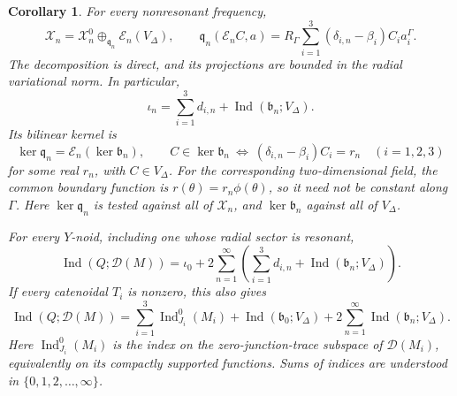 \documentclass[11pt,twoside]{amsart}
\newtheorem{cor}[thm]{Corollary}
\numberwithin{equation}{section}
\begin{document}
\begin{cor}\label{coro: general index decom}
For every nonresonant frequency,
\[
\mathcal X_n=\mathcal X_n^0\oplus_{\mathfrak q_n}\mathscr E_n(V_\Delta),
\qquad
\mathfrak q_n(\mathscr E_n C,a)
=R_\Gamma\sum_{i=1}^3(\delta_{i,n}-\beta_i)C_i a_i^\Gamma.
\]
The decomposition is direct, and its projections are bounded in the radial variational norm. In particular,
\[
\iota_n=\sum_{i=1}^3d_{i,n}
+\operatorname{Ind}(\mathfrak b_n;V_\Delta).
\]
Its bilinear kernel is
\[
\ker\mathfrak q_n
=\mathscr E_n(\ker\mathfrak b_n),
\qquad
C\in\ker\mathfrak b_n
\ \Longleftrightarrow\
(\delta_{i,n}-\beta_i)C_i=r_n\quad(i=1,2,3)
\]
for some real $r_n$, with $C\in V_\Delta$. For the corresponding two-dimensional field, the common boundary function is $r(\theta)=r_n\phi(\theta)$, so it need not be constant along $\Gamma$. Here $\ker\mathfrak q_n$ is tested against all of $\mathcal X_n$, and $\ker\mathfrak b_n$ against all of $V_\Delta$.

For every $Y$-noid, including one whose radial sector is resonant,
\[
\operatorname{Ind}(Q;\mathcal D(M))
=\iota_0+2\sum_{n=1}^{\infty}
\left(\sum_{i=1}^3d_{i,n}+\operatorname{Ind}(\mathfrak b_n;V_\Delta)\right).
\]
If every catenoidal $T_i$ is nonzero, this also gives
\[
\operatorname{Ind}(Q;\mathcal D(M))
=\sum_{i=1}^3 \operatorname{Ind}_{J_i}^0(M_i)
+\operatorname{Ind}(\mathfrak b_0;V_\Delta)
+2\sum_{n=1}^{\infty}\operatorname{Ind}(\mathfrak b_n;V_\Delta).
\]
Here $\operatorname{Ind}_{J_i}^0(M_i)$ is the index on the zero-junction-trace subspace of $\mathcal D(M_i)$, equivalently on its compactly supported functions. Sums of indices are understood in $\{0,1,2,\ldots,\infty\}$.
\end{cor}
\end{document}
